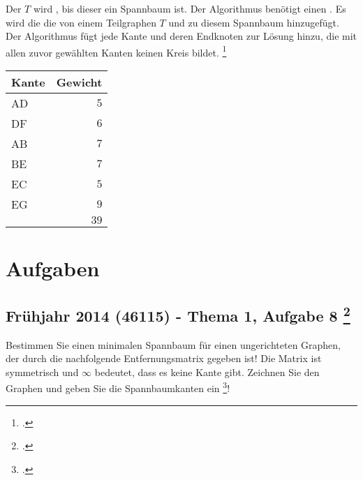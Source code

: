 \documentclass{lehramt-informatik}
\begin{document}
Der  $T$ wird , bis
dieser ein Spannbaum ist. Der Algorithmus benötigt einen
. Es wird die die  von
einem Teilgraphen $T$  und zu diesem
Spannbaum hinzugefügt. Der Algorithmus fügt jede Kante und deren
Endknoten zur Lösung hinzu, die mit allen zuvor gewählten Kanten keinen
Kreis bildet.
\footcite[Seite 32, (PDF 26)]{aud:fs:6}

\begin{minipage}{7cm}
\end{minipage}
\begin{minipage}{4cm}
\begin{center}
\begin{tabular}{|l|r|}
\hline
Kante & Gewicht\\\hline\hline
AD & $5$\\
DF & $6$\\
AB & $7$\\
BE & $7$\\
EC & $5$\\
EG & $9$\\\hline
   & $39$\\\hline
\end{tabular}
\end{center}
\end{minipage}


\chapter{Aufgaben}

\section{Frühjahr 2014 (46115) - Thema 1, Aufgabe 8
\footcite[Seite 1-2, Aufgabe 2: Spannbäume]{aud:ab:6}}

Bestimmen Sie einen minimalen Spannbaum für einen ungerichteten Graphen,
der durch die nachfolgende Entfernungsmatrix gegeben ist! Die Matrix ist
symmetrisch und $\infty$ bedeutet, dass es keine Kante gibt. Zeichnen
Sie den Graphen und geben Sie die Spannbaumkanten ein
\footcite[Seite 5 (PDF 4)]{examen:46115:2014:03}!
\end{document}
